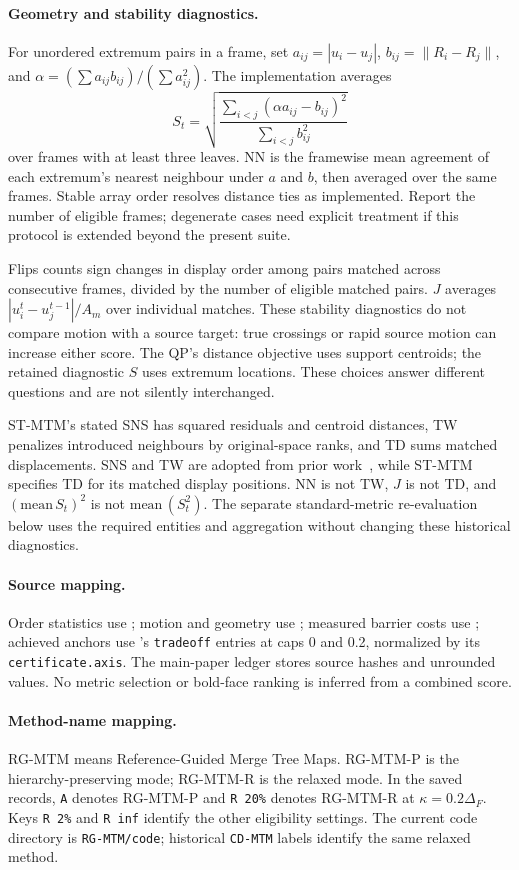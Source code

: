\paragraph{Geometry and stability diagnostics.}
For unordered extremum pairs in a frame, set $a_{ij}=|u_i-u_j|$, $b_{ij}=\|R_i-R_j\|$, and $\alpha=(\sum a_{ij}b_{ij})/(\sum a_{ij}^2)$. The implementation averages
\[
 S_t=\sqrt{\frac{\sum_{i<j}(\alpha a_{ij}-b_{ij})^2}{\sum_{i<j}b_{ij}^2}}
\]
over frames with at least three leaves. NN is the framewise mean agreement of each extremum's nearest neighbour under $a$ and $b$, then averaged over the same frames. Stable array order resolves distance ties as implemented. Report the number of eligible frames; degenerate cases need explicit treatment if this protocol is extended beyond the present suite.

Flips counts sign changes in display order among pairs matched across consecutive frames, divided by the number of eligible matched pairs. $J$ averages $|u_i^t-u_j^{t-1}|/A_m$ over individual matches. These stability diagnostics do not compare motion with a source target: true crossings or rapid source motion can increase either score. The QP's distance objective uses support centroids; the retained diagnostic $S$ uses extremum locations. These choices answer different questions and are not silently interchanged.

ST-MTM's stated SNS has squared residuals and centroid distances, TW penalizes introduced neighbours by original-space ranks, and TD sums matched displacements. SNS and TW are adopted from prior work~\cite{Smelser:2025:Scale,Venna:2001:NP}, while ST-MTM specifies TD for its matched display positions. NN is not TW, $J$ is not TD, and $(\mathrm{mean}\,S_t)^2$ is not $\mathrm{mean}\,(S_t^2)$. The separate standard-metric re-evaluation below uses the required entities and aggregation without changing these historical diagnostics.

\paragraph{Source mapping.}
Order statistics use ; motion and geometry use ; measured barrier costs use ; achieved anchors use 's \texttt{tradeoff} entries at caps 0 and 0.2, normalized by its \texttt{certificate.axis}. The main-paper ledger stores source hashes and unrounded values. No metric selection or bold-face ranking is inferred from a combined score.

\paragraph{Method-name mapping.}
RG-MTM means Reference-Guided Merge Tree Maps. RG-MTM-P is the hierarchy-preserving mode; RG-MTM-R is the relaxed mode. In the saved records, \texttt{A} denotes RG-MTM-P and \texttt{R 20\%} denotes RG-MTM-R at $\kappa=0.2\Delta_F$. Keys \texttt{R 2\%} and \texttt{R inf} identify the other eligibility settings. The current code directory is \texttt{RG-MTM/code}; historical \texttt{CD-MTM} labels identify the same relaxed method.
